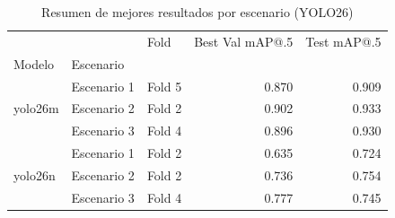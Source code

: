 \begin{table}
\caption{Resumen de mejores resultados por escenario (YOLO26)}
\label{tab:best_results_yolo26}
\begin{tabular}{lllrr}
\toprule
 &  & Fold & Best Val mAP@.5 & Test mAP@.5 \\
Modelo & Escenario &  &  &  \\
\midrule
\multirow[c]{3}{*}{yolo26m} & Escenario 1 & Fold 5 & 0.870 & 0.909 \\
 & Escenario 2 & Fold 2 & 0.902 & 0.933 \\
 & Escenario 3 & Fold 4 & 0.896 & 0.930 \\
\multirow[c]{3}{*}{yolo26n} & Escenario 1 & Fold 2 & 0.635 & 0.724 \\
 & Escenario 2 & Fold 2 & 0.736 & 0.754 \\
 & Escenario 3 & Fold 4 & 0.777 & 0.745 \\
\bottomrule
\end{tabular}
\end{table}
